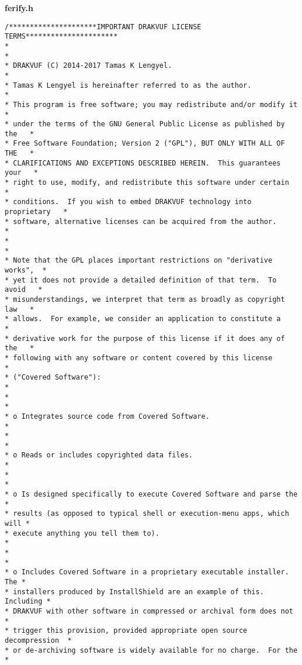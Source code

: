 \textbf{ferify.h}
\selectfont
\begin{lstlisting}[style=CStyle]
/*********************IMPORTANT DRAKVUF LICENSE TERMS**********************
*                                                                         *
* DRAKVUF (C) 2014-2017 Tamas K Lengyel.                                  *
* Tamas K Lengyel is hereinafter referred to as the author.               *
* This program is free software; you may redistribute and/or modify it    *
* under the terms of the GNU General Public License as published by the   *
* Free Software Foundation; Version 2 ("GPL"), BUT ONLY WITH ALL OF THE   *
* CLARIFICATIONS AND EXCEPTIONS DESCRIBED HEREIN.  This guarantees your   *
* right to use, modify, and redistribute this software under certain      *
* conditions.  If you wish to embed DRAKVUF technology into proprietary   *
* software, alternative licenses can be acquired from the author.         *
*                                                                         *
* Note that the GPL places important restrictions on "derivative works",  *
* yet it does not provide a detailed definition of that term.  To avoid   *
* misunderstandings, we interpret that term as broadly as copyright law   *
* allows.  For example, we consider an application to constitute a        *
* derivative work for the purpose of this license if it does any of the   *
* following with any software or content covered by this license          *
* ("Covered Software"):                                                   *
*                                                                         *
* o Integrates source code from Covered Software.                         *
*                                                                         *
* o Reads or includes copyrighted data files.                             *
*                                                                         *
* o Is designed specifically to execute Covered Software and parse the    *
* results (as opposed to typical shell or execution-menu apps, which will *
* execute anything you tell them to).                                     *
*                                                                         *
* o Includes Covered Software in a proprietary executable installer.  The *
* installers produced by InstallShield are an example of this.  Including *
* DRAKVUF with other software in compressed or archival form does not     *
* trigger this provision, provided appropriate open source decompression  *
* or de-archiving software is widely available for no charge.  For the    *

\end{lstlisting}
